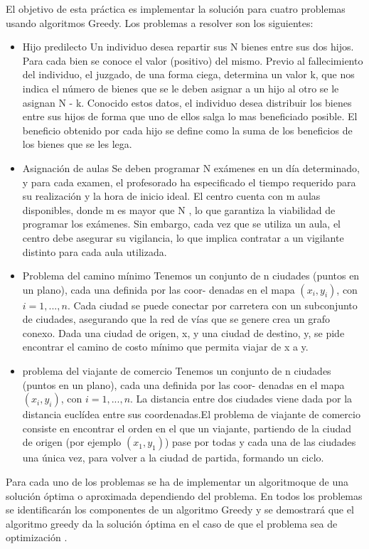\documentclass[11pt,openany]{book}
\begin{document}
El objetivo de esta práctica es implementar la solución para cuatro problemas 
usando algoritmos Greedy. Los problemas a resolver son los siguientes: 
\begin{itemize}

      \item Hijo predilecto 
            Un individuo desea repartir sus N bienes entre sus dos hijos. Para cada bien se conoce el
            valor (positivo) del mismo. Previo al fallecimiento del individuo, el juzgado, de una forma ciega,
            determina un valor k, que nos indica el número de bienes que se le deben asignar a un hijo al
            otro se le asignan N - k. Conocido estos datos, el individuo desea distribuir los bienes entre
            sus hijos de forma que uno de ellos salga lo mas beneficiado posible. El beneficio obtenido por
            cada hijo se define como la suma de los beneficios de los bienes que se les lega.
      \item Asignación de aulas
            Se deben programar N exámenes en un día determinado, y para cada examen, el profesorado ha especificado el tiempo
            requerido para su realización y la hora de inicio ideal.
            El centro cuenta con m aulas disponibles, donde m es mayor que N , lo que garantiza la
            viabilidad de programar los exámenes. Sin embargo, cada vez que se utiliza un aula, el centro
            debe asegurar su vigilancia, lo que implica contratar a un vigilante distinto para cada aula
            utilizada.
      \item Problema del camino mínimo
            Tenemos un conjunto de n ciudades (puntos en un plano), cada una definida por las coor-
            denadas en el mapa $(x_i , y_i )$, con $i = 1, . . . , n$. Cada ciudad se puede conectar por carretera con
            un subconjunto de ciudades, asegurando que la red de vías que se genere crea un grafo conexo.
            Dada una ciudad de origen, x, y una ciudad de destino, y, se pide encontrar el camino de
            costo mínimo que permita viajar de x a y.
      \item problema del viajante de comercio
            Tenemos un conjunto de n ciudades (puntos en un plano), cada una definida por las coor-
            denadas en el mapa $(x_i , y_i )$, con $i = 1, . . . , n$. La distancia entre dos ciudades viene dada por la
            distancia euclídea entre sus coordenadas.El problema de viajante de comercio consiste en encontrar el orden en el que un viajante,
            partiendo de la ciudad de origen (por ejemplo $(x_1 , y_1 )$) pase por todas y cada una de las ciudades
            una única vez, para volver a la ciudad de partida, formando un ciclo.

\end{itemize}
Para cada uno de los problemas se ha de implementar
un algoritmoque de una solución óptima o aproximada dependiendo del problema. 
En todos los problemas se identificarán los componentes de un algoritmo Greedy y se demostrará que el algoritmo
greedy da la solución óptima en el caso de que el problema sea de optimización . 
\end{document}
